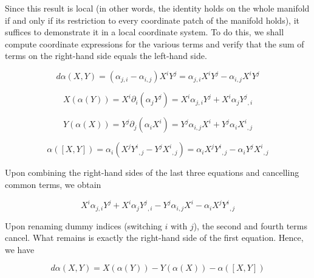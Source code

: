 \documentclass[12pt]{article}
\begin{document}
Since this result is local (in other words, the identity holds on the whole manifold if and only if its restriction to every coordinate patch of the manifold holds), it suffices to demonstrate it in a local coordinate system.  To do this, we shall compute coordinate expressions for the various terms and verify that the sum of terms on the right-hand side equals the left-hand side.

\[ d\alpha (X,Y) = (\alpha_{j,i} - \alpha_{i,j}) X^i Y^j = \alpha_{j,i} X^i Y^j -   \alpha_{i,j} X^i Y^j \]

\[ X(\alpha(Y)) = X^i \partial_i (\alpha_j Y^j) = X^i \alpha_{j,i} Y^j + X^i \alpha_j {Y^j}_{,i} \]

\[ Y(\alpha(X)) = Y^j \partial_j (\alpha_i X^i) = Y^j \alpha_{i,j} X^i + Y^j \alpha_i {X^i}_{,j} \]

\[ \alpha([X,Y]) = \alpha_i (X^j {Y^i}_{,j} - Y^j {X^i}_{,j}) = \alpha_i X^j {Y^i}_{,j} - \alpha_i Y^j {X^i}_{,j}\]

Upon combining the right-hand sides of the last three equations and cancelling common terms, we obtain

\[ X^i \alpha_{j,i} Y^j + X^i \alpha_j {Y^j}_{,i} - Y^j \alpha_{i,j} X^i  - \alpha_i X^j {Y^i}_{,j} \]

Upon renaming dummy indices (switching $i$ with $j$), the second and fourth terms cancel.  What remains is exactly the right-hand side of the first equation.  Hence, we have

\[ d\alpha (X,Y) = X(\alpha(Y)) - Y(\alpha(X)) - \alpha([X,Y]) \]
\end{document}
